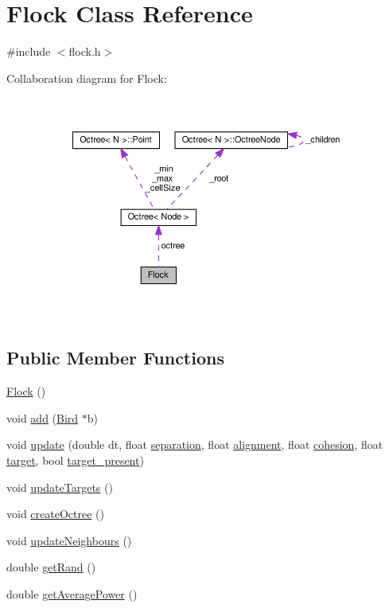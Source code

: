 \hypertarget{classFlock}{}\section{Flock Class Reference}
\label{classFlock}


{\ttfamily \#include $<$flock.\+h$>$}



Collaboration diagram for Flock\+:
\nopagebreak
\begin{figure}[H]
\begin{center}
\leavevmode
\includegraphics[width=350pt]{classFlock__coll__graph}
\end{center}
\end{figure}
\subsection*{Public Member Functions}
\begin{DoxyCompactItemize}
\item 
\hyperlink{classFlock_a2a0a514c368e21f718ad7358ed42f3b7}{Flock} ()
\item 
void \hyperlink{classFlock_a2bc42b2940b1ef99c120f58ee7918775}{add} (\hyperlink{classBird}{Bird} $\ast$b)
\item 
void \hyperlink{classFlock_aba009392cab937cd3911278a56c12bfc}{update} (double dt, float \hyperlink{main_8cpp_a3d47f7e2bf80c3044a1c4fb985d08565}{separation}, float \hyperlink{main_8cpp_a9b609437b0a9c5266747f6a31b8bf90e}{alignment}, float \hyperlink{main_8cpp_ab665ec90cc49c91ed2d1e7e0ca3c386e}{cohesion}, float \hyperlink{main_8cpp_af0df2177301e4061ab72ade2ea437bcd}{target}, bool \hyperlink{main_8cpp_aae9e26fee26af7722250e6b27dbdf37a}{target\+\_\+present})
\item 
void \hyperlink{classFlock_abb8739e196b8d11699f06d9670c1768b}{update\+Targets} ()
\item 
void \hyperlink{classFlock_a8657b4c8affd9ad6a87c119f592baccb}{create\+Octree} ()
\item 
void \hyperlink{classFlock_a597ecc4f44495e610c7ff516d94ca560}{update\+Neighbours} ()
\item 
double \hyperlink{classFlock_a9c91990979a1d4cab91c5abd1d3ac983}{get\+Rand} ()
\item 
double \hyperlink{classFlock_a65ae41c2c0eaaab0498c5a091d63a776}{get\+Average\+Power} ()
\end{DoxyCompactItemize}
